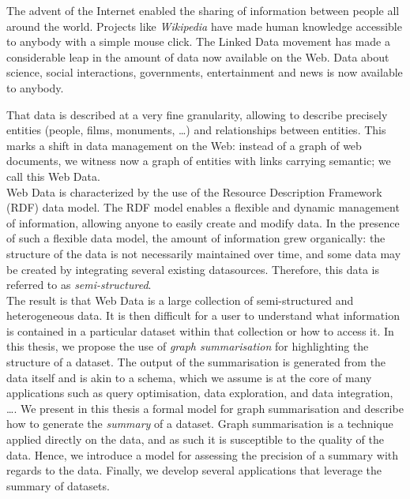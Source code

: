 The advent of the Internet enabled the sharing of information between people all around the world. Projects like \emph{Wikipedia} have made human knowledge accessible to anybody with a simple mouse click. The Linked Data movement has made a considerable leap in the amount of data now available on the Web. Data about science, social interactions, governments, entertainment and news is now available to anybody.

That data is described at a very fine granularity, allowing to describe precisely entities (people, films, monuments, \ldots) and relationships between entities. This marks a shift in data management on the Web: instead of a graph of web documents, we witness now a graph of entities with links carrying semantic; we call this Web Data.\\

Web Data is characterized by the use of the Resource Description Framework (RDF) data model. The RDF model enables a flexible and dynamic management of information, allowing anyone to easily create and modify data. In the presence of such a flexible data model, the amount of information grew organically: the structure of the data is not necessarily maintained over time, and some data may be created by integrating several existing datasources. Therefore, this data is referred to as \emph{semi-structured}.\\

The result is that Web Data is a large collection of semi-structured and heterogeneous data. It is then difficult for a user to understand what information is contained in a particular dataset within that collection or how to access it. In this thesis, we propose the use of \emph{graph summarisation} for highlighting the structure of a dataset. The output of the summarisation is generated from the data itself and is akin to a schema, which we assume is at the core of many applications such as query optimisation, data exploration, and data integration, \ldots.
We present in this thesis a formal model for graph summarisation and describe how to generate the \emph{summary} of a dataset. Graph summarisation is a technique applied directly on the data, and as such it is susceptible to the quality of the data. Hence, we introduce a model for assessing the precision of a summary with regards to the data. Finally, we develop several applications that leverage the summary of datasets.
